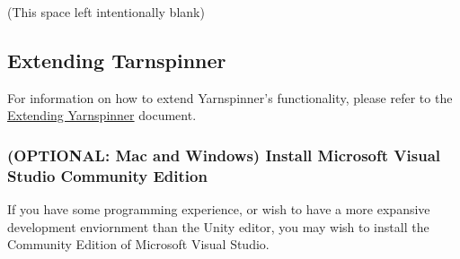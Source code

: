 (This space left intentionally blank)

\subsection*{Extending Tarnspinner}

For information on how to extend Yarnspinner's functionality, please refer to the \hyperlink{a00176}{Extending Yarnspinner} document.

\subsubsection*{(O\-P\-T\-I\-O\-N\-A\-L\-: Mac and Windows) Install Microsoft Visual Studio Community Edition}

If you have some programming experience, or wish to have a more expansive development enviornment than the Unity editor, you may wish to install the Community Edition of Microsoft Visual Studio. 